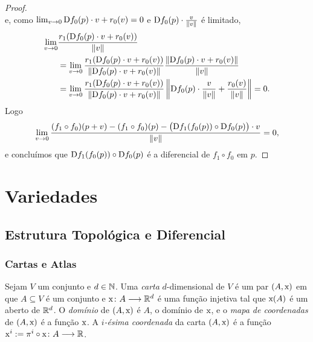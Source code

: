 \begin{proof}
\begin{equation*}
	\end{equation*}
e, como $\lim_{v \rightarrow 0} \mathrm{D} f_0(p) \cdot v + r_0(v) = 0$ e $\mathrm{D} f_0(p) \cdot \frac{v}{\left\Vert{v}\right\Vert}$ é limitado,
	\begin{align*}
	\lim_{v \rightarrow 0} &\frac{r_1(\mathrm{D} f_0(p) \cdot v + r_0(v))}{\left\Vert{v}\right\Vert} \\
		&= \lim_{v \rightarrow 0} \frac{r_1(\mathrm{D} f_0(p) \cdot v + r_0(v))}{\left\Vert{\mathrm{D}f_0(p) \cdot v + r_0(v)}\right\Vert} \frac{\left\Vert{\mathrm{D}f_0(p) \cdot v + r_0(v)}\right\Vert}{\left\Vert{v}\right\Vert}\\
		&= \lim_{v \rightarrow 0} \frac{r_1(\mathrm{D} f_0(p) \cdot v + r_0(v))}{\left\Vert{\mathrm{D}f_0(p) \cdot v + r_0(v)}\right\Vert} \left\Vert{\mathrm{D}f_0(p) \cdot \frac{v}{\left\Vert{v}\right\Vert}+ \frac{r_0(v)}{\left\Vert{v}\right\Vert}}\right\Vert = 0.
	\end{align*}
Logo
	\begin{equation*}
	\lim_{v \rightarrow 0} \frac{(f_1 \circ f_0)(p+v) - (f_1 \circ f_0)(p) - \big(\mathrm{D} f_1(f_0(p)) \circ \mathrm{D} f_0(p)\big) \cdot v}{\left\Vert{v}\right\Vert} = 0,
	\end{equation*}
e concluímos que $\mathrm{D} f_1(f_0(p)) \circ \mathrm{D} f_0(p)$ é a diferencial de $f_1 \circ f_0$ em $p$.
\end{proof}















\chapter{Variedades}

\section{Estrutura Topológica e  Diferencial}

\subsection{Cartas e Atlas}

\begin{defi}
Sejam $V$ um conjunto e $d \in \mathbb{N}$. Uma \emph{carta} $d$-dimensional de $V$ é um par $(A,\mathrm{x})$ em que $A \subseteq V$ é um conjunto e $\mathrm{x}\colon A \longrightarrow \mathbb{R}^d$ é uma função injetiva tal que $\mathrm{x}(A)$ é um aberto de $\mathbb{R}^d$. O \emph{domínio} de $(A,\mathrm{x})$ é $A$, o domínio de $\mathrm{x}$, e o \emph{mapa de coordenadas} de $(A,\mathrm{x})$ é a função $\mathrm{x}$. A \emph{$i$-ésima coordenada} da carta $(A,\mathrm{x})$ é a função $\mathrm{x}^i := \pi^i \circ \mathrm{x}\colon A \longrightarrow \mathbb{R}$.
\end{defi}

